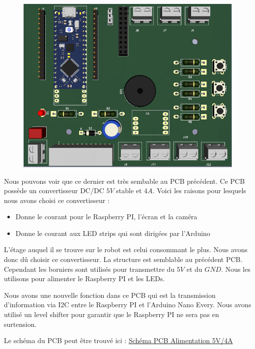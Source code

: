 \documentclass[
	a4paper,									%
	11pt,										%
	twoside,									%
	openright,									%
	notitlepage,									%
	parskip=half,								%
]{scrreprt}										%
\begin{document}
\begin{figure}[!h]
	\centering
	\includegraphics[scale=.7]{img/Alimentation5v4A.png}
	\label{Alim4A}
\end{figure}

Nous pouvons voir que ce dernier est très sembable au PCB précédent. Ce PCB possède un convertisseur DC/DC $5V$ stable
et $4A$. Voici les raisons pour lesquels nous avons choisi ce convertisseur : 

\begin{itemize}
	\item Donne le courant pour le Raspberry PI, l'écran et la caméra
	\item Donne le courant aux LED strips qui sont dirigées par l'Arduino
\end{itemize}

L'étage auquel il se trouve sur le robot est celui consommant le plus. Nous avons donc dû choisir ce convertisseur.
La structure est semblable au précédent PCB. Cependant les borniers sont utilisés pour transmettre du $5V$ et du $GND$.
Nous les utilisons pour alimenter le Raspberry PI et les LEDs. \par

Nous avons une nouvelle fonction dans ce PCB qui est la transmission d'information via I2C entre le Raspberry PI et
l'Arduino Nano Every. Nous avons utilisé un level shifter pour garantir que le Raspberry PI ne sera pas en surtension. \par

Le schéma du PCB peut être trouvé ici : \href{run:./Schema_Alim_4.pdf}{Schéma PCB Alimentation 5V/4A}
\end{document}
